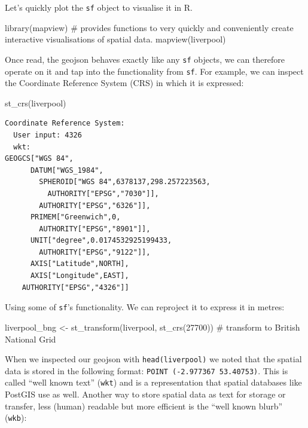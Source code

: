 \documentclass[
  letterpaper,
  DIV=11,
  numbers=noendperiod]{scrreprt}
\newenvironment{Shaded}{\begin{snugshade}}{\end{snugshade}}
\newcommand{\CommentTok}[1]{\textcolor[rgb]{0.37,0.37,0.37}{#1}}
\newcommand{\DecValTok}[1]{\textcolor[rgb]{0.68,0.00,0.00}{#1}}
\newcommand{\FunctionTok}[1]{\textcolor[rgb]{0.28,0.35,0.67}{#1}}
\newcommand{\NormalTok}[1]{\textcolor[rgb]{0.00,0.23,0.31}{#1}}
\newcommand{\OtherTok}[1]{\textcolor[rgb]{0.00,0.23,0.31}{#1}}
\begin{document}
Let's quickly plot the \texttt{sf} object to visualise it in R.

\begin{Shaded}
\begin{Highlighting}[]
\FunctionTok{library}\NormalTok{(mapview) }\CommentTok{\# provides functions to very quickly and conveniently create interactive visualisations of spatial data.}
\FunctionTok{mapview}\NormalTok{(liverpool)}
\end{Highlighting}
\end{Shaded}

Once read, the geojson behaves exactly like any \texttt{sf} objects, we
can therefore operate on it and tap into the functionality from
\texttt{sf}. For example, we can inspect the Coordinate Reference System
(CRS) in which it is expressed:

\begin{Shaded}
\begin{Highlighting}[]
\FunctionTok{st\_crs}\NormalTok{(liverpool)}
\end{Highlighting}
\end{Shaded}

\begin{verbatim}
Coordinate Reference System:
  User input: 4326 
  wkt:
GEOGCS["WGS 84",
      DATUM["WGS_1984",
        SPHEROID["WGS 84",6378137,298.257223563,
          AUTHORITY["EPSG","7030"]],
        AUTHORITY["EPSG","6326"]],
      PRIMEM["Greenwich",0,
        AUTHORITY["EPSG","8901"]],
      UNIT["degree",0.0174532925199433,
        AUTHORITY["EPSG","9122"]],
      AXIS["Latitude",NORTH],
      AXIS["Longitude",EAST],
    AUTHORITY["EPSG","4326"]]
\end{verbatim}

Using some of \texttt{sf}'s functionality. We can reproject it to
express it in metres:

\begin{Shaded}
\begin{Highlighting}[]
\NormalTok{liverpool\_bng }\OtherTok{\textless{}{-}} \FunctionTok{st\_transform}\NormalTok{(liverpool, }\FunctionTok{st\_crs}\NormalTok{(}\DecValTok{27700}\NormalTok{)) }\CommentTok{\# transform to British National Grid}
\end{Highlighting}
\end{Shaded}

When we inspected our geojson with \texttt{head(liverpool)} we noted
that the spatial data is stored in the following format:
\texttt{POINT\ (-2.977367\ 53.40753)}. This is called ``well known
text'' (\texttt{wkt}) and is a representation that spatial databases
like PostGIS use as well. Another way to store spatial data as text for
storage or transfer, less (human) readable but more efficient is the
``well known blurb'' (\texttt{wkb}):
\end{document}
